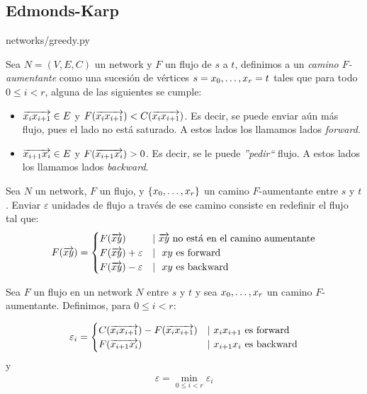 \subsection{Edmonds-Karp}

\begin{lstinputlisting}[language=python]{networks/greedy.py}
\end{lstinputlisting}

\begin{definition}
  Sea $N = (V,E,C)$ un network y $F$ un flujo de $s$ a $t$, definimos a un
  \emph{camino $F$-aumentante} como una sucesión de vértices
  $s = x_0, \mathellipsis, x_r = t$ tales que para todo $0 \le i < r$, alguna
  de las siguientes se cumple:
  \begin{itemize}
  \item $\overrightarrow{x_i x_{i+1}} \in E$ y
    $F(\overrightarrow{x_i x_{i+1}}) < C(\overrightarrow{x_i x_{i+1}})$. Es decir, se puede enviar aún
    más flujo, pues el lado no está saturado. A estos lados los llamamos lados
    \emph{forward}.
  \item $\overrightarrow{x_{i+1} x_i} \in E$ y $F(\overrightarrow{x_{i+1} x_i}) > 0$. Es decir, se le
    puede \emph{''pedir``} flujo. A estos lados los llamamos lados
    \emph{backward}.
  \end{itemize}
\end{definition}

\begin{definition}
  Sea $N$ un network, $F$ un flujo, y $\{x_0,\mathellipsis,x_r\}$ un camino
  $F$-aumentante entre $s$ y $t$. Enviar $\varepsilon$ unidades de flujo a
  través de ese camino consiste en redefinir el flujo tal que:
  \begin{align}
    F(\overrightarrow{xy}) =
    \begin{cases}
      F(\overrightarrow{xy}) & |\ \text{$\overrightarrow{xy}$ no está en el camino aumentante}\\
      F(\overrightarrow{xy}) + \varepsilon & |\ \text{ $xy$ es forward}\\
      F(\overrightarrow{xy}) - \varepsilon & |\ \text{ $xy$ es backward}
    \end{cases}
  \end{align}
\end{definition}

\begin{definition}
  Sea $F$ un flujo en un network $N$ entre $s$ y $t$ y sea
  $x_0, \mathellipsis, x_r$ un camino $F$-aumentante.
  Definimos, para $0 \le i < r:$
  
  \begin{align}
    \varepsilon_i = 
    \begin{cases}
      C(\overrightarrow{x_ix_{i+1}}) - F(\overrightarrow{x_ix_{i+1}}) & |\ x_ix_{i+1} \text{ es forward}\\
      F(\overrightarrow{x_{i+1} x_i}) & |\ x_{i+1}x_i \text{ es backward}
    \end{cases}
  \end{align}
  y
  \begin{align}
    \varepsilon = \min_{0 \le i < r} \varepsilon_i
  \end{align}
\end{definition}

